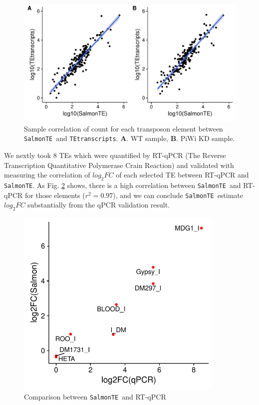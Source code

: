 \documentclass{ws-procs11x85}
\newcommand{\TEtranscripts}{\texttt{TEtranscripts}}
\newcommand{\SalmonTE}{\texttt{SalmonTE}}
\begin{document}
\begin{figure}[h]
\centerline{
\includegraphics[width=13cm]{figure_corr_count}
}
\caption{Sample correlation of count for each transposon element between \SalmonTE~and \TEtranscripts. \textbf{A}. WT sample, \textbf{B}. PiWi KD sample.}
\label{aba:fig3}
\end{figure}

We nextly took 8 TEs which were quantified by RT-qPCR
(The Reverse Transcription Quantitative Polymerase Crain Reaction)
and validated with measuring the correlation of $log_{2}FC$ of each selected TE between RT-qPCR and \SalmonTE.
As Fig. \ref{aba:fig4} shows, there is a high correlation between \SalmonTE~and RT-qPCR for those elements ($r^2=0.97$), and we can conclude
\SalmonTE~estimate $log_{2}FC$ substantially from the qPCR validation result.

\begin{figure}[h]
\centerline{
\includegraphics[width=10cm]{supp_fig3_corr}
}
\caption{Comparison between \SalmonTE~and RT-qPCR}
\label{aba:fig4}
\end{figure}
\end{document}
